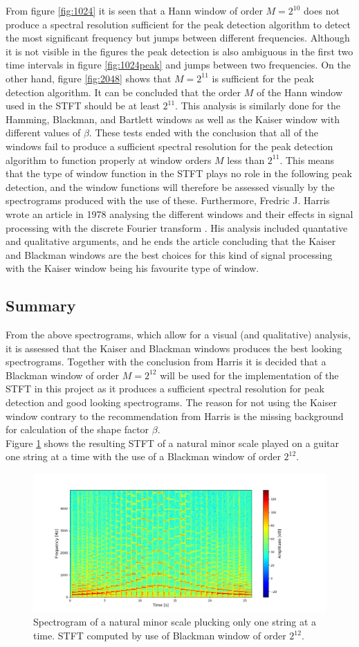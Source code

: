From figure \ref{fig:1024} it is seen that a Hann window of order $M=2^{10}$ does not produce a spectral resolution sufficient for the peak detection algorithm to detect the most significant frequency but jumps between different frequencies. Although it is not visible in the figures the peak detection is also ambiguous in the first two time intervals in figure \ref{fig:1024peak} and jumps between two frequencies. On the other hand, figure \ref{fig:2048} shows that $M=2^{11}$ is sufficient for the peak detection algorithm. It can be concluded that the order $M$ of the Hann window used in the STFT should be at least $2^{11}$. This analysis is similarly done for the Hamming, Blackman, and Bartlett windows as well as the Kaiser window with different values of $\beta$. These tests ended with the conclusion that all of the windows fail to produce a sufficient spectral resolution for the peak detection algorithm to function properly at window orders $M$ less than $2^{11}$. This means that the type of window function in the STFT plays no role in the following peak detection, and the window functions will therefore be assessed visually by the spectrograms produced with the use of these. Furthermore, Fredric J. Harris wrote an article in 1978 analysing the different windows and their effects in signal processing with the discrete Fourier transform \cite{page 82, fredric_harris}. His analysis included quantative and qualitative arguments, and he ends the article concluding that the Kaiser and Blackman windows are the best choices for this kind of signal processing with the Kaiser window being his favourite type of window.

\subsection{Summary}
From the above spectrograms, which allow for a visual (and qualitative) analysis, it is assessed that the Kaiser and Blackman windows produces the best looking spectrograms. Together with the conclusion from Harris it is decided that a Blackman window of order $M=2^{12}$ will be used for the implementation of the STFT in this project as it produces a sufficient spectral resolution for peak detection and good looking spectrograms. The reason for not using the Kaiser window contrary to the recommendation from Harris is the missing background for calculation of the shape factor $\beta$.\\
Figure \ref{fig:STFT_test_signal} shows the resulting STFT of a natural minor scale played on a guitar one string at a time with the use of a Blackman window of order $2^{12}$.

\begin{figure}[H]
\centering
\includegraphics[width = 1.1\textwidth]{figures/validation/stft/scale.png}
\caption{Spectrogram of a natural minor scale plucking only one string at a time. STFT computed by use of Blackman window of order $2^{12}$.}
\label{fig:STFT_test_signal}
\end{figure}